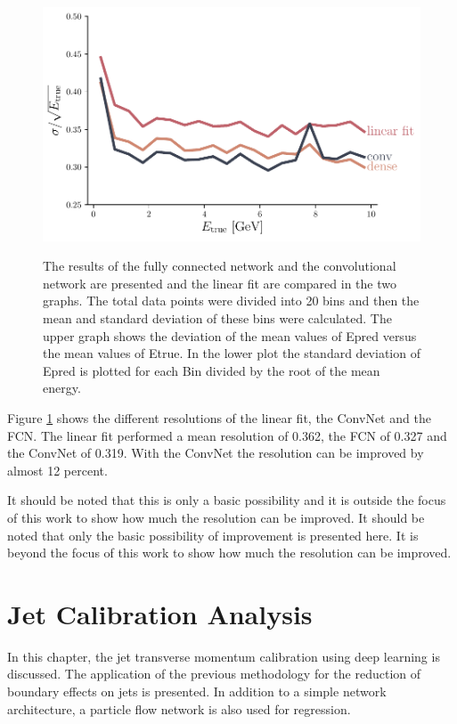 \documentclass[12pt, a4paper]{thesis}
\begin{document}
\begin{figure}[htbp]
\centering
\includegraphics[width=.9\linewidth]{../images/arch_comparison.pdf}
\label{arch_comparison}
\caption{ The results of the fully connected network and the
  convolutional network are presented and the linear fit are compared
  in the two graphs. The total data points were divided into 20 bins
  and then the mean and standard deviation of these bins were
  calculated. The upper graph shows the deviation of the mean values
  of Epred versus the mean values of Etrue. In the lower plot the
  standard deviation of Epred is plotted for each Bin divided by the
  root of the mean energy.}
\end{figure}

Figure \ref{arch_comparison} shows the different resolutions of the
linear fit, the ConvNet and the FCN. The linear fit performed a mean
resolution of 0.362, the FCN of 0.327 and the ConvNet of 0.319. With
the ConvNet the resolution can be improved by almost 12 percent.

It should be noted that this is only a basic possibility and it is
outside the focus of this work to show how much the resolution can be
improved.  It should be noted that only the basic possibility of
improvement is presented here. It is beyond the focus of this work to
show how much the resolution can be improved.

\chapter{Jet Calibration Analysis}
\label{sec:org03a9b39}

In this chapter, the jet transverse momentum calibration using deep
learning is discussed. The application of the previous methodology for
the reduction of boundary effects on jets is presented. In addition to
a simple network architecture, a particle flow network is also used
for regression.
\end{document}
